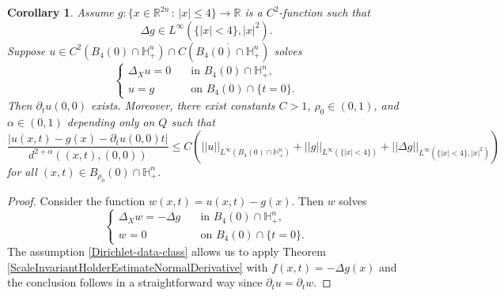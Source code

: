 \documentclass[12pt]{amsart}
\newtheorem{Corollary}[Theorem]{Corollary}
\newcommand{\R}{{\mathbb R}}
\def \H {{\mathbb H}}
\begin{document}
\begin{Corollary}\label{ScaleInvariantHolderEstimateNormalDerivativeWithDirichletData}
Assume $g: \{x\in\R^{2n}\,:\, |x|\leq 4\}\to \R$ is a $C^2$-function such 
that  
\begin{equation}\label{Dirichlet-data-class}
\Delta g \in L^{\infty}(\{|x|<4\},|x|^2).
\end{equation}
Suppose $u\in C^2(B_{4}(0)\cap \H^n_+) \cap C(\overline{B_{4}(0)\cap \H^n_+})$ solves
\[
\begin{cases}
\Delta_X u = 0 & \quad \text{in } B_{4}(0)\cap \H^n_+, \\
u = g & \quad \text{on }B_{4}(0)\cap \{t=0\}.
\end{cases}
\]
Then $\partial_t u(0,0)$ exists. Moreover, there exist constants $C > 1$, $\rho_0\in(0,1)$, and $\alpha \in (0,1)$ depending only on $Q$ such that
\[
\frac{|u(x,t) - g(x) - \partial_t u(0,0) t|}{d^{2+\alpha}((x,t),(0,0)) } \leq C\left( ||u||_{L^{\infty}(B_{4}(0)\cap \H^n_+)}+ ||g||_{L^{\infty}(\{|x|<4\})}  + ||\Delta g||_{L^{\infty}(\{|x|<4\},|x|^{2})} \right)
\]
for all $(x,t) \in B_{\rho_0}(0)\cap \H^n_+$.
\end{Corollary}
\begin{proof}
Consider the function $w(x,t) = u(x,t) - g(x)$. Then $w$ solves
\[
\begin{cases}
\Delta_X w = -\Delta g & \quad \text{in } B_{4}(0)\cap \H^n_+, \\
w = 0 & \quad \text{on }B_{4}(0)\cap \{t=0\}.
\end{cases}
\]
The assumption \eqref{Dirichlet-data-class} allows us to apply Theorem \ref{ScaleInvariantHolderEstimateNormalDerivative} with $f(x,t)=-\Delta g(x)$ and the conclusion follows in a straightforward way since $\partial_t u=\partial_t w$.
\end{proof}
\end{document}
